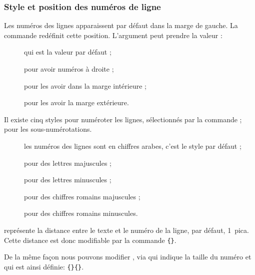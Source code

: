 \begin{minipage}{0.8\textwidth}

\end{minipage}

\subsubsection{Style et position des numéros de ligne}


Les numéros des lignes apparaissent  par défaut dans la marge de gauche. La commande  redéfinit cette position. L'argument peut prendre la valeur :

\begin{description}
\item[] qui est la valeur par défaut ;
\item[] pour avoir numéros  à droite ;
\item[] pour les avoir dans la marge intérieure ;
\item[] pour les avoir la marge extérieure.
\end{description}

Il existe   cinq styles pour numéroter les lignes, sélectionnés par la commande 
 ;  pour les sous-numérotations.

\begin{description} 
\item[] les numéros des lignes sont en chiffres arabes, c'est le style par défaut ; 
\item[] pour des lettres majuscules ;
\item[] pour des lettres minuscules ;
\item[] pour des chiffres romains majuscules ; 
\item[] pour des chiffres romains minuscules. 
\end{description}

 représente la distance entre le texte et le numéro de la ligne, par défaut, 1~pica. 
Cette distance est donc modifiable par la commande \verb|{|\verb|}|. 

De la même façon nous pouvons modifier , via  qui indique la taille du numéro et qui est ainsi définie:
 \verb|{|\verb|}{|\verb|}|. 
 

